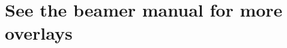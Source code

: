\documentclass{beamer} %
\begin{document}
\maketitle
\maketoc

% 
% 

\section*{See the beamer manual for more overlays} %

\appendix %

% 
\end{document}
